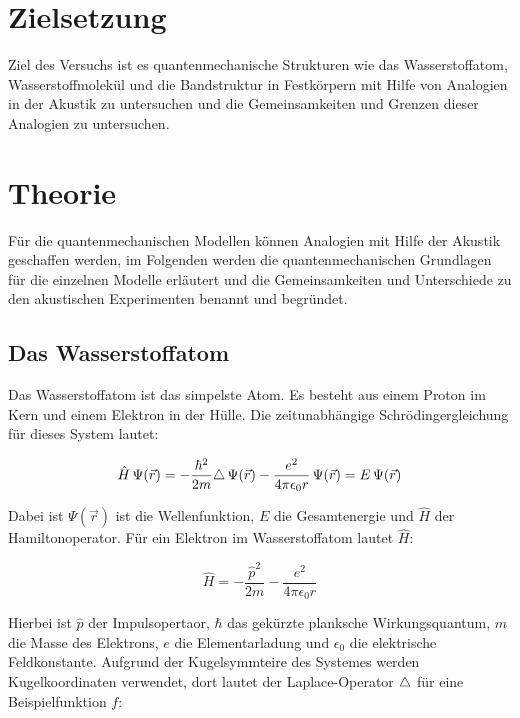 \section{Zielsetzung}
\label{sec:ziel}

Ziel des Versuchs ist es quantenmechanische Strukturen wie das Wasserstoffatom, Wasserstoffmolekül und die Bandstruktur in Festkörpern mit Hilfe von Analogien in der Akustik zu untersuchen und die Gemeinsamkeiten und Grenzen dieser Analogien zu untersuchen. 

\section{Theorie}
\label{sec:theorie}

Für die quantenmechanischen Modellen können Analogien mit Hilfe der Akustik geschaffen werden, im Folgenden werden die quantenmechanischen Grundlagen für die einzelnen Modelle erläutert und die Gemeinsamkeiten und Unterschiede zu den akustischen Experimenten benannt und begründet. 

\subsection{Das Wasserstoffatom}
\label{sec:H}

Das Wasserstoffatom ist das simpelste Atom. Es besteht aus einem Proton im Kern und einem Elektron in der Hülle. Die zeitunabhängige Schrödingergleichung für dieses System lautet:

\begin{equation}
    \hat{H} \, \Psi \! \left( \vec{r} \right) = - \frac{\hbar^2}{2 m} \! \mathop{}\!\mathbin\bigtriangleup \, \Psi \! \left( \vec{r} \right)- \frac{e^2}{4 \pi \epsilon_0 r} \, \Psi \! \left( \vec{r} \right) = E \, \Psi \! \left( \vec{r} \right)
    \label{eqn:schroedinger}
\end{equation}

Dabei ist $\Psi \! \left( \vec{r} \right)$ ist die Wellenfunktion, $E$ die Gesamtenergie und $\hat{H}$ der Hamiltonoperator. Für ein Elektron im Wasserstoffatom lautet $\hat{H}$:

\begin{equation}
    \hat{H} = - \frac{\hat{p}^2}{2 m} - \frac{e^2}{4 \pi \epsilon_0 r}
    \label{eqn:H_H}
\end{equation}

Hierbei ist $\hat{p}$ der Impulsopertaor, $\hbar$ das gekürzte planksche Wirkungsquantum, $m$ die Masse des Elektrons, $e$ die Elementarladung und $\epsilon_0$ die elektrische Feldkonstante. Aufgrund der Kugelsymmteire des Systemes werden Kugelkoordinaten verwendet, dort lautet der Laplace-Operator $\mathop{}\!\mathbin\bigtriangleup$ für eine Beispielfunktion $f$:

